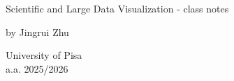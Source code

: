 \begin{titlepage}
    \begin{center}
        \vspace*{2cm}
        
        \LARGE
        Scientific and Large Data Visualization - class notes
        
        \vspace{0.5cm}

        
        \vspace{1.5cm}
        by Jingrui Zhu
   		  \vspace{1.5cm}
        
       
        \vfill
                
        \vspace{0.8cm}
        University of Pisa\\
        {a.a. 2025/2026}
        
    \end{center}
\end{titlepage}